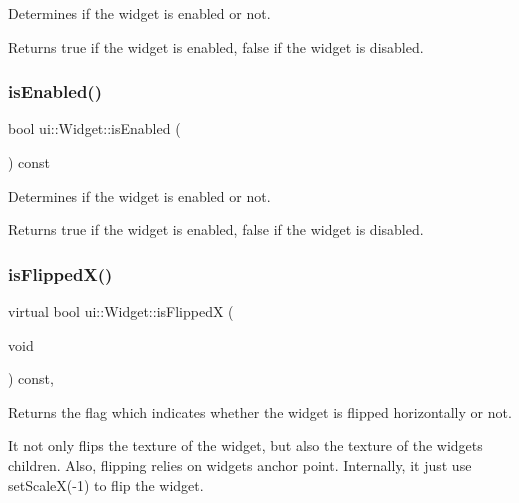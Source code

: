 Determines if the widget is enabled or not.

\begin{DoxyReturn}{Returns}
true if the widget is enabled, false if the widget is disabled. 
\end{DoxyReturn}
\mbox{\label{classui_1_1Widget_a483d1547b7786c8a8da795f1f2ca1342}} 
\subsubsection{\texorpdfstring{is\+Enabled()}{isEnabled()}\hspace{0.1cm}{\footnotesize\ttfamily [2/2]}}
{\footnotesize\ttfamily bool ui\+::\+Widget\+::is\+Enabled (\begin{DoxyParamCaption}{ }\end{DoxyParamCaption}) const}

Determines if the widget is enabled or not.

\begin{DoxyReturn}{Returns}
true if the widget is enabled, false if the widget is disabled. 
\end{DoxyReturn}
\mbox{\label{classui_1_1Widget_aa21dc6a63ebb20bc0dc78293d0f03256}} 
\subsubsection{\texorpdfstring{is\+Flipped\+X()}{isFlippedX()}\hspace{0.1cm}{\footnotesize\ttfamily [1/2]}}
{\footnotesize\ttfamily virtual bool ui\+::\+Widget\+::is\+FlippedX (\begin{DoxyParamCaption}\item[{void}]{ }\end{DoxyParamCaption}) const\hspace{0.3cm}{\ttfamily [inline]}, {\ttfamily [virtual]}}

Returns the flag which indicates whether the widget is flipped horizontally or not.

It not only flips the texture of the widget, but also the texture of the widget\textquotesingle{}s children. Also, flipping relies on widget\textquotesingle{}s anchor point. Internally, it just use set\+ScaleX(-\/1) to flip the widget.

